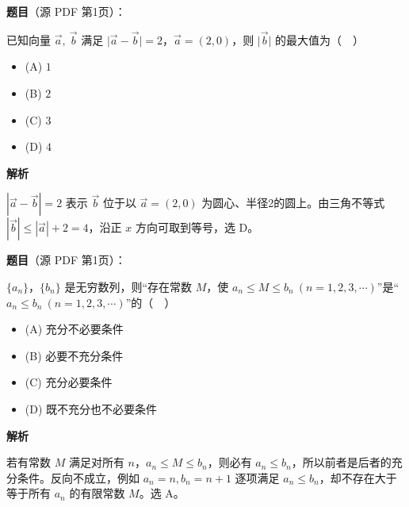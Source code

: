 \begin{answer}

\textbf{题目}（源 PDF 第1页）：

已知向量 \(\vec a,\ \vec b\) 满足 \(\lvert\vec a-\vec b\rvert=2\)，\(\vec a=(2,0)\)，则 \(\lvert\vec b\rvert\) 的最大值为（　）

\begin{itemize}
\item (A) \(1\)
\item (B) \(2\)
\item (C) \(3\)
\item (D) \(4\)
\end{itemize}

\textbf{解析}

\(|\vec a-\vec b|=2\) 表示 \(\vec b\) 位于以 \(\vec a=(2,0)\) 为圆心、半径2的圆上。由三角不等式 \(|\vec b|\le|\vec a|+2=4\)，沿正 \(x\) 方向可取到等号，选 D。


\end{answer}
\begin{answer}

\textbf{题目}（源 PDF 第1页）：

\(\{a_n\}\)，\(\{b_n\}\) 是无穷数列，则“存在常数 \(M\)，使 \(a_n\leq M\leq b_n\ (n=1,2,3,\cdots)\)”是“\(a_n\leq b_n\ (n=1,2,3,\cdots)\)”的（　）

\begin{itemize}
\item (A) 充分不必要条件
\item (B) 必要不充分条件
\item (C) 充分必要条件
\item (D) 既不充分也不必要条件
\end{itemize}

\textbf{解析}

若有常数 \(M\) 满足对所有 \(n\)，\(a_n\le M\le b_n\)，则必有 \(a_n\le b_n\)，所以前者是后者的充分条件。反向不成立，例如 \(a_n=n,b_n=n+1\) 逐项满足 \(a_n\le b_n\)，却不存在大于等于所有 \(a_n\) 的有限常数 \(M\)。选 A。


\end{answer}
